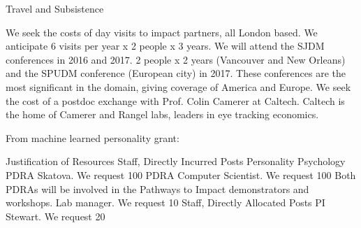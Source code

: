 Travel and Subsistence

We seek the costs of day visits to impact partners, all London based. We anticipate 6 visits per year x 2 people x 3 years. We will attend the SJDM conferences in 2016 and 2017. 2
people x 2 years (Vancouver and New Orleans) and the SPUDM conference (European city)
in 2017. These conferences are the most significant in the domain, giving coverage of
America and Europe. We seek the cost of a postdoc exchange with Prof. Colin Camerer at
Caltech. Caltech is the home of Camerer and Rangel labs, leaders in eye tracking economics.




From machine learned personality grant:

Justification of Resources
Staff, Directly Incurred Posts
Personality Psychology PDRA Skatova. We request 100%
PDRA Computer Scientist. We request 100%
Both PDRAs will be involved in the Pathways to Impact demonstrators and workshops.
Lab manager. We request 10%
Staff, Directly Allocated Posts
PI Stewart. We request 20%
